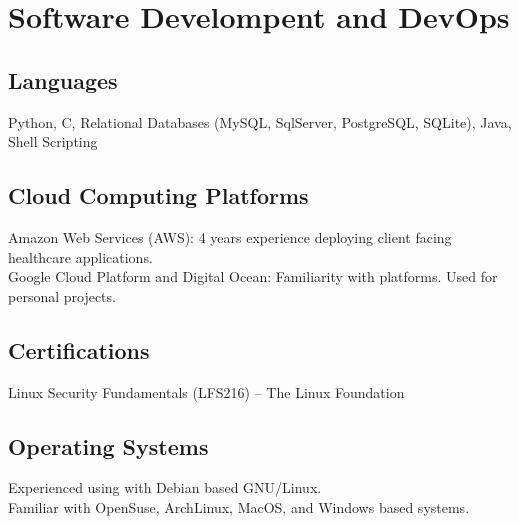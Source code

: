 \section{Software Develompent and DevOps}


\subsection{Languages}
Python,
C,
Relational Databases (MySQL, SqlServer, PostgreSQL, SQLite),
Java,
Shell Scripting

\subsection{Cloud Computing Platforms}
Amazon Web Services (AWS): 4 years experience deploying client facing healthcare applications.\\
Google Cloud Platform and Digital Ocean: Familiarity with platforms. Used for personal projects.


\subsection{Certifications}
Linux Security Fundamentals (LFS216) -- The Linux Foundation

\subsection{Operating Systems}
Experienced using with Debian based GNU/Linux.\\
Familiar with OpenSuse, ArchLinux, MacOS, and Windows based systems.

